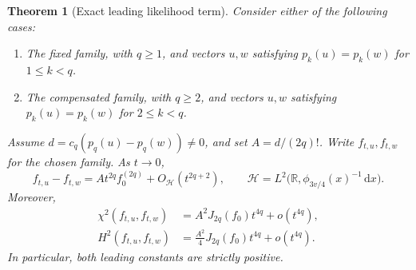 \documentclass[11pt,a4paper]{article}
\numberwithin{equation}{section}
\newtheorem{theorem}{Theorem}[section]
\theoremstyle{definition}
\theoremstyle{remark}
\newcommand{\R}{\mathbb R}
\newcommand{\dd}{\,\mathrm d}
\begin{document}
\begin{theorem}[Exact leading likelihood term]
\label{thm:likelihood}
Consider either of the following cases:
\begin{enumerate}[label=(\alph*)]
\item The fixed family, with $q\ge1$, and vectors $u,w$ satisfying
$p_k(u)=p_k(w)$ for $1\le k<q$.
\item The compensated family, with $q\ge2$, and vectors $u,w$ satisfying
$p_k(u)=p_k(w)$ for $2\le k<q$.
\end{enumerate}
Assume $d=c_q(p_q(u)-p_q(w))\ne0$, and set $A=d/(2q)!$. Write $f_{t,u},f_{t,w}$
for the chosen family. As $t\to0$,
\begin{equation}
 f_{t,u}-f_{t,w}
   =A t^{2q}f_0^{(2q)}+O_{\mathcal H}(t^{2q+2}),
 \qquad \mathcal H=L^2\bigl(\R,\phi_{3v/4}(x)^{-1}\dd x\bigr).
 \label{eq:densityexpansion}
\end{equation}
Moreover,
\begin{align}
 \chi^2(f_{t,u},f_{t,w})
   &=A^2J_{2q}(f_0)t^{4q}+o(t^{4q}),
 \label{eq:chiexpansion}\\
 H^2(f_{t,u},f_{t,w})
   &=\frac{A^2}{4}J_{2q}(f_0)t^{4q}+o(t^{4q}).
 \label{eq:hexpansion}
\end{align}
In particular, both leading constants are strictly positive.
\end{theorem}
\end{document}
